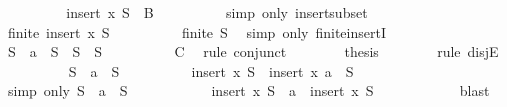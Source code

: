 \begin{isabellebody}
\ \ \ \ \ \ \isamarkupfalse%
\ \isamarkupfalse%
\ {\isachardoublequoteopen}insert\ x\ S{\isacharprime}\ {\isasymsubseteq}\ B{\isachardoublequoteclose}\isanewline
\ \ \ \ \ \ \ \ \isamarkupfalse%
\ {\isacharparenleft}simp\ only{\isacharcolon}\ insert{\isacharunderscore}subset{\isacharparenright}\isanewline
\ \ \ \ \ \ \isamarkupfalse%
\ {\isachardoublequoteopen}finite\ {\isacharparenleft}insert\ x\ S{\isacharprime}{\isacharparenright}{\isachardoublequoteclose}\isanewline
\ \ \ \ \ \ \ \ \isamarkupfalse%
\ {\isacartoucheopen}finite\ S{\isacharprime}{\isacartoucheclose}\ \isamarkupfalse%
\ {\isacharparenleft}simp\ only{\isacharcolon}\ finite{\isachardot}insertI{\isacharparenright}\isanewline
\ \ \ \ \ \ \isamarkupfalse%
\ {\isachardoublequoteopen}S\ {\isacharequal}\ {\isacharbraceleft}a{\isacharbraceright}\ {\isasymunion}\ S{\isacharprime}\ {\isasymor}\ S\ {\isacharequal}\ S{\isacharprime}{\isachardoublequoteclose}\isanewline
\ \ \ \ \ \ \ \ \isamarkupfalse%
\ C{}\ \isamarkupfalse%
\ {\isacharparenleft}rule\ conjunct{}{\isacharparenright}\isanewline
\ \ \ \ \ \ \isamarkupfalse%
\ {\isacharquery}thesis\isanewline
\ \ \ \ \ \ \isamarkupfalse%
\ {\isacharparenleft}rule\ disjE{\isacharparenright}\isanewline
\ \ \ \ \ \ \ \ \isamarkupfalse%
\ {\isachardoublequoteopen}S\ {\isacharequal}\ {\isacharbraceleft}a{\isacharbraceright}\ {\isasymunion}\ S{\isacharprime}{\isachardoublequoteclose}\isanewline
\ \ \ \ \ \ \ \ \isamarkupfalse%
\ {\isachardoublequoteopen}insert\ x\ S\ {\isacharequal}\ insert\ x\ {\isacharparenleft}{\isacharbraceleft}a{\isacharbraceright}\ {\isasymunion}\ S{\isacharprime}{\isacharparenright}{\isachardoublequoteclose}\isanewline
\ \ \ \ \ \ \ \ \ \ \isamarkupfalse%
\ {\isacharparenleft}simp\ only{\isacharcolon}\ {\isacartoucheopen}S\ {\isacharequal}\ {\isacharbraceleft}a{\isacharbraceright}\ {\isasymunion}\ S{\isacharprime}{\isacartoucheclose}{\isacharparenright}\isanewline
\ \ \ \ \ \ \ \ \isamarkupfalse%
\ \isamarkupfalse%
\ {\isachardoublequoteopen}insert\ x\ S\ {\isacharequal}\ {\isacharbraceleft}a{\isacharbraceright}\ {\isasymunion}\ {\isacharparenleft}insert\ x\ S{\isacharprime}{\isacharparenright}{\isachardoublequoteclose}\isanewline
\ \ \ \ \ \ \ \ \ \ \isamarkupfalse%
\ blast\isanewline
\ \ \ \ \ \ \ \ \isamarkupfalse%

\end{isabellebody}

